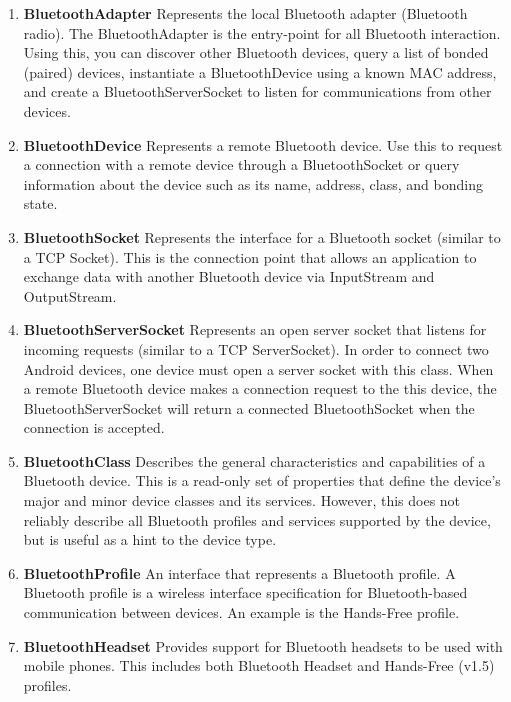 \documentclass[11pt]{report}
\begin{document}
\begin{enumerate}
\item \textbf{BluetoothAdapter}\newline 
Represents the local Bluetooth adapter (Bluetooth radio). The BluetoothAdapter is the entry-point for all Bluetooth interaction. Using this, you can discover other Bluetooth devices, query a list of bonded (paired) devices, instantiate a BluetoothDevice using a known MAC address, and create a BluetoothServerSocket to listen for communications from other devices.
\item \textbf{BluetoothDevice}\newline 
Represents a remote Bluetooth device. Use this to request a connection with a remote device through a BluetoothSocket or query information about the device such as its name, address, class, and bonding state.
\item \textbf{BluetoothSocket}\newline 
Represents the interface for a Bluetooth socket (similar to a TCP Socket). This is the connection point that allows an application to exchange data with another Bluetooth device via InputStream and OutputStream.
\item \textbf{BluetoothServerSocket}\newline 
Represents an open server socket that listens for incoming requests (similar to a TCP ServerSocket). In order to connect two Android devices, one device must open a server socket with this class. When a remote Bluetooth device makes a connection request to the this device, the BluetoothServerSocket will return a connected BluetoothSocket when the connection is accepted.
\item \textbf{BluetoothClass}\newline 
Describes the general characteristics and capabilities of a Bluetooth device. This is a read-only set of properties that define the device's major and minor device classes and its services. However, this does not reliably describe all Bluetooth profiles and services supported by the device, but is useful as a hint to the device type.
\item \textbf{BluetoothProfile}\newline 
An interface that represents a Bluetooth profile. A Bluetooth profile is a wireless interface specification for Bluetooth-based communication between devices. An example is the Hands-Free profile. 
\item \textbf{BluetoothHeadset}\newline 
Provides support for Bluetooth headsets to be used with mobile phones. This includes both Bluetooth Headset and Hands-Free (v1.5) profiles.


\end{enumerate}
\end{document}
